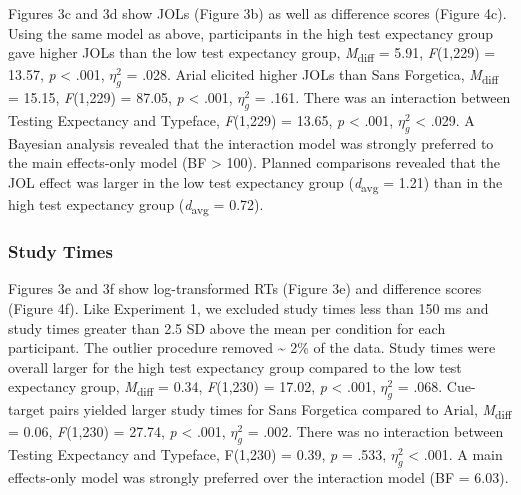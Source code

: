 \documentclass[
  english,
  jou]{apa7}
\begin{document}
Figures 3c and 3d show JOLs (Figure 3b) as well as difference scores (Figure 4c). Using the same model as above, participants in the high test expectancy group gave higher JOLs than the low test expectancy group, \emph{M}\textsubscript{diff} = 5.91, \emph{F}(1,229) = 13.57, \emph{p} \textless{} .001, \(\eta_{g}^{2}\) = .028. Arial elicited higher JOLs than Sans Forgetica, \emph{M}\textsubscript{diff} = 15.15, \emph{F}(1,229) = 87.05, \emph{p} \textless{} .001, \(\eta_{g}^{2}\) = .161. There was an interaction between Testing Expectancy and Typeface, \emph{F}(1,229) = 13.65, \emph{p} \textless{} .001, \(\eta_{g}^{2}\) \textless{} .029. A Bayesian analysis revealed that the interaction model was strongly preferred to the main effects-only model (BF \textgreater{} 100). Planned comparisons revealed that the JOL effect was larger in the low test expectancy group (\emph{d}\textsubscript{avg} = 1.21) than in the high test expectancy group (\emph{d}\textsubscript{avg} = 0.72).

\hypertarget{study-times-1}{%
\subsubsection{Study Times}\label{study-times-1}}

Figures 3e and 3f show log-transformed RTs (Figure 3e) and difference scores (Figure 4f). Like Experiment 1, we excluded study times less than 150 ms and study times greater than 2.5 SD above the mean per condition for each participant. The outlier procedure removed \textasciitilde{} 2\% of the data. Study times were overall larger for the high test expectancy group compared to the low test expectancy group, \emph{M}\textsubscript{diff} = 0.34, \emph{F}(1,230) = 17.02, \emph{p} \textless{} .001, \(\eta_{g}^{2}\) = .068. Cue-target pairs yielded larger study times for Sans Forgetica compared to Arial, \emph{M}\textsubscript{diff} = 0.06, \emph{F}(1,230) = 27.74, \emph{p} \textless{} .001, \(\eta_{g}^{2}\) = .002. There was no interaction between Testing Expectancy and Typeface, F(1,230) = 0.39, \emph{p} = .533, \(\eta_{g}^{2}\) \textless{} .001. A main effects-only model was strongly preferred over the interaction model (BF = 6.03).
\end{document}
